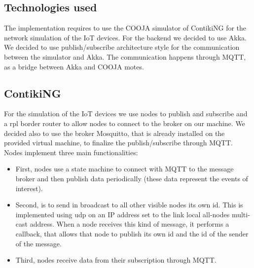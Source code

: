 \documentclass[10pt]{article}
\begin{document}
	\subsection{Technologies used}
	The implementation requires to use the COOJA simulator of ContikiNG for the network simulation of the IoT devices. For the backend we decided to use Akka. We decided to use publish/subscribe architecture style for the communication between the simulator and Akka. The communication happens through MQTT, as a bridge between Akka and COOJA motes.
	
	\subsection{ContikiNG}
	For the simulation of the IoT devices we use nodes to publish and subscribe and a rpl border router to allow nodes to connect to the broker on our machine. We decided also to use the broker Mosquitto, that is already installed on the provided virtual machine, to finalize the publish/subscribe through MQTT. Nodes implement three main functionalities:
	
	\begin{itemize}
		\item 	First,  nodes use a state machine to connect with MQTT to the message broker and then publish data periodically (these data represent the events of interest).    
		\item   Second,	 is to send in broadcast to all other visible nodes its own id. This is implemented using udp on an IP address set to the link local all-nodes multi-cast address. When a node receives this kind of message, it performs a callback, that allows that node to publish its own id and the id of the sender of the message.
		\item	Third, nodes receive data from their subscription through MQTT.	
	\end{itemize}
	
\end{document}
